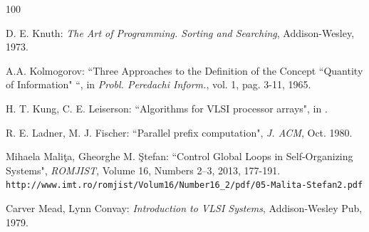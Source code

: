 \begin{thebibliography}{100}

 D. E. Knuth: {\em The Art of Programming. Sorting and Searching}, Addison-Wesley, 1973.

 A.A. Kolmogorov: ``Three Approaches to the
Definition of the Concept ``Quantity of Information" ``, in {\em
Probl. Peredachi Inform.}, vol. 1, pag. 3-11, 1965.

 H. T. Kung, C. E. Leiserson: ``Algorithms for VLSI processor arrays", in \cite{Mead}.

 R. E. Ladner, M. J. Fischer: ``Parallel prefix computation", {\em J. ACM}, Oct. 1980.




 Mihaela Mali\c ta, Gheorghe M. \c Stefan: ``Control Global Loops in Self-Organizing Systems", {\em ROMJIST}, Volume 16, Numbers 2–3, 2013, 177-191. \\ {\tt http://www.imt.ro/romjist/Volum16/Number16\_2/pdf/05-Malita-Stefan2.pdf}


 Carver Mead, Lynn Convay: {\em Introduction to VLSI Systems}, Addison-Wesley Pub, 1979.



\end{thebibliography}
